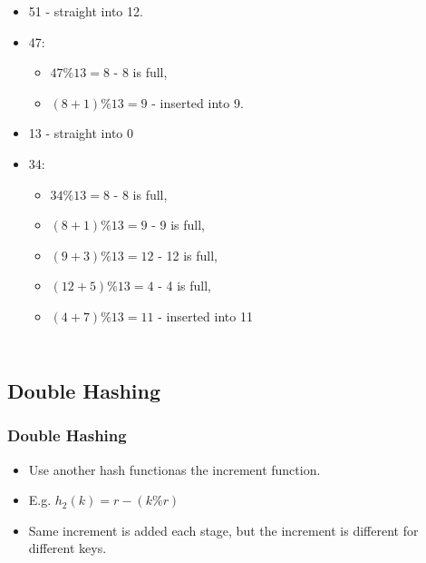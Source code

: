 \documentclass{beamer}
\begin{document}
\begin{frame}
\begin{columns}[t]
{\begin{itemize}
\begin{itemize}
\tiny
\item $29\%13 = 3$ - 3 is full,
\item $(3+1)\%13 = 4$ - inserted into 4.
\end{itemize}
\item 51 - straight into 12.
\item 47:
\begin{itemize}
\tiny
\item $47\%13 = 8$ - 8 is full,
\item $(8+1)\%13 = 9$ - inserted into 9.
\end{itemize}
\item 13 - straight into 0
\item 34:
\begin{itemize}
\tiny
\item $34\%13 = 8$ - 8 is full,
\item $(8+1)\%13 = 9$ - 9 is full,
\item $(9+3)\%13 = 12$ - 12 is full,
\item $(12+5)\%13 = 4$ - 4 is full,
\item $(4+7)\%13 = 11$ - inserted into 11
\end{itemize}
\end{itemize}
}
\end{columns}
\end{frame}
\subsection{Double Hashing}
\begin{frame}
\frametitle{Double Hashing}
\begin{itemize}
\item Use another hash functionas the increment function.
\item E.g. $h_2(k) = r - (k\%r)$
\item Same increment is added each stage, but the increment is different for different keys.
\end{itemize}
\dh
\end{frame}
\end{document}
